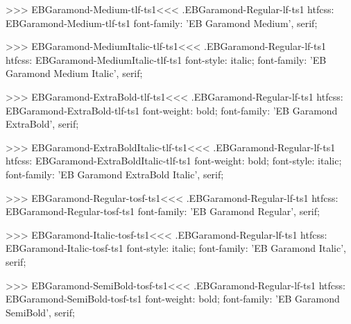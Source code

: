 {{{{{{{>>>
\<EBGaramond-Medium-tlf-ts1\><<<
.EBGaramond-Regular-lf-ts1
htfcss:  EBGaramond-Medium-tlf-ts1  font-family: 'EB Garamond Medium', serif;

>>>
\<EBGaramond-MediumItalic-tlf-ts1\><<<
.EBGaramond-Regular-lf-ts1
htfcss:  EBGaramond-MediumItalic-tlf-ts1  font-style: italic; font-family: 'EB Garamond Medium Italic', serif;

>>>
\<EBGaramond-ExtraBold-tlf-ts1\><<<
.EBGaramond-Regular-lf-ts1
htfcss:  EBGaramond-ExtraBold-tlf-ts1  font-weight: bold; font-family: 'EB Garamond ExtraBold', serif;

>>>
\<EBGaramond-ExtraBoldItalic-tlf-ts1\><<<
.EBGaramond-Regular-lf-ts1
htfcss:  EBGaramond-ExtraBoldItalic-tlf-ts1  font-weight: bold; font-style: italic; font-family: 'EB Garamond ExtraBold Italic', serif;

>>>
\<EBGaramond-Regular-tosf-ts1\><<<
.EBGaramond-Regular-lf-ts1
htfcss:  EBGaramond-Regular-tosf-ts1  font-family: 'EB Garamond Regular', serif;

>>>
\<EBGaramond-Italic-tosf-ts1\><<<
.EBGaramond-Regular-lf-ts1
htfcss:  EBGaramond-Italic-tosf-ts1  font-style: italic; font-family: 'EB Garamond Italic', serif;

>>>
\<EBGaramond-SemiBold-tosf-ts1\><<<
.EBGaramond-Regular-lf-ts1
htfcss:  EBGaramond-SemiBold-tosf-ts1  font-weight: bold; font-family: 'EB Garamond SemiBold', serif;

}}}}}}}
